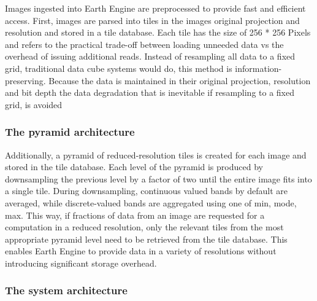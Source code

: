 \documentclass[11pt,twoside,a4paper,final]{report}
\begin{document}
Images ingested into Earth Engine are preprocessed to provide fast and efficient access. First, images are parsed into tiles in the images original projection and resolution and stored in a tile database. Each tile has the size of 256 * 256 Pixels and refers to the practical trade-off between loading unneeded data vs the overhead of issuing additional reads. Instead of resampling all data to a fixed grid, traditional data cube systems would do, this method is information-preserving. Because the data is maintained in their original projection, resolution and bit depth the data degradation that is inevitable if resampling to a fixed grid, is avoided

\subsubsection{The pyramid architecture}

Additionally, a pyramid of reduced-resolution tiles is created for each image and stored in the tile database. Each level of the pyramid is produced by downsampling the previous level by a factor of two until the entire image fits into a single tile. During downsampling, continuous valued bands by default are averaged, while discrete-valued bands are aggregated using one of min, mode, max. This way, if fractions of data from an image are requested for a computation in a reduced resolution, only the relevant tiles from the most appropriate pyramid level need to be retrieved from the tile database. This enables Earth Engine to provide data in a variety of resolutions without introducing significant storage overhead.


\subsubsection{The system architecture}
\end{document}
